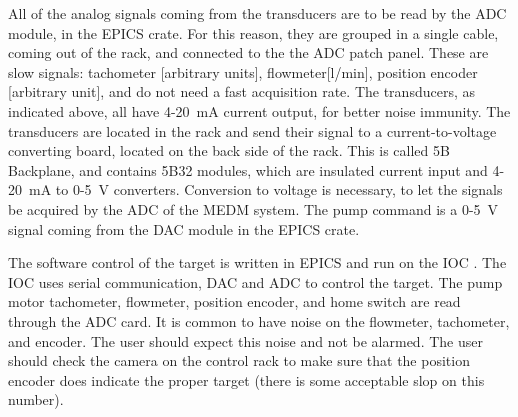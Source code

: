 { %


All of the analog signals coming from the transducers are to be read
by the ADC module, in the EPICS crate. For this reason, they are grouped
in a single cable, coming out of the rack, and connected to the the
ADC patch panel. These are slow signals: tachometer {[}arbitrary units{]},
flowmeter{[}l/min{]}, position encoder {[}arbitrary unit{]}, and do
not need a fast acquisition rate. The transducers, as indicated above,
all have 4-20~mA current output, for better noise immunity. The transducers
are located in the rack and send their signal to a current-to-voltage
converting board, located on the back side of the rack. This is called
5B Backplane, and contains 5B32 modules, which are insulated current
input and 4-20~mA to 0-5~V converters. Conversion to voltage is
necessary, to let the signals be acquired by the ADC of the MEDM system.
The pump command is a 0-5~V signal coming from the DAC module in
the EPICS crate.

The software control of the target is written in EPICS and run on
the IOC . The IOC uses serial communication, DAC
and ADC to control the target. The pump motor tachometer, flowmeter,
position encoder, and home switch are read through the ADC card. It
is common to have noise on the flowmeter, tachometer, and encoder.
The user should expect this noise and not be alarmed. The user should
check the camera on the control rack to make sure that the position
encoder does indicate the proper target (there is some acceptable
slop on this number).

}
